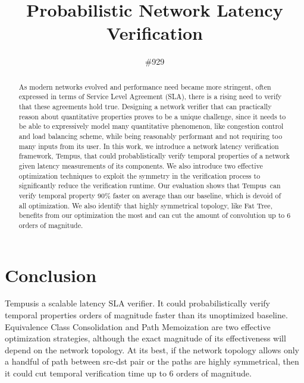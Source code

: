 \documentclass[10pt,sigconf,letterpaper]{acmart}
\title{Probabilistic Network Latency Verification}
\author{\#929}
\newcommand{\tool}[0]{Tempus}
\begin{document}
\begin{abstract}
    As modern networks evolved and performance need became more stringent, often 
    expressed in terms of Service Level Agreement (SLA), there is a rising need to verify that these 
    agreements hold true.
    Designing a network verifier that can practically reason about quantitative properties proves to be 
    a unique challenge, since it needs to be able to expressively model many quantitative phenomenon, like 
    congestion control and load balancing scheme, while being reasonably performant and not 
    requiring too many inputs from its user. 
    In this work, we introduce a network latency verification framework, \tool, that could probablistically 
    verify temporal properties of a network given latency measurements of its components. 
    We also introduce two effective optimization techniques to exploit the symmetry in the verification 
    process to significantly reduce the verification runtime.
    Our evaluation shows that \tool\ can verify temporal property 90\% faster on average than 
    our baseline, which is devoid of all optimization.
    We also identify that highly symmetrical topology, like Fat Tree, benefits from our optimization the most 
    and can cut the amount of convolution up to 6 orders of magnitude.
\end{abstract}

\maketitle



















\section{Conclusion} \label{sec:conc}
\tool is a scalable latency SLA verifier. 
It could probabilistically verify temporal properties orders of magnitude faster than its unoptimized 
baseline.
Equivalence Class Consolidation and Path Memoization are two effective optimization strategies, 
although the exact magnitude of its effectiveness will depend on the network topology. 
At its best, if the network topology allows only a handful of path between src-dst pair or the paths are 
highly symmetrical, then it could cut temporal verification time up to 6 orders of magnitude.



\end{document}
